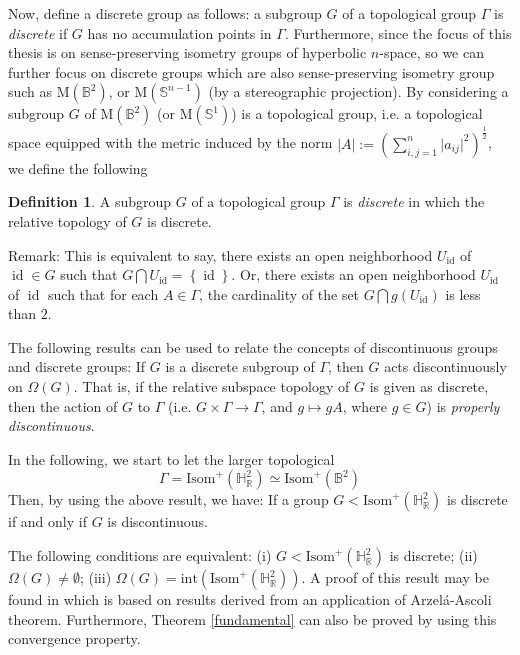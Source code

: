 \documentclass[12pt,oneside]{sfsuthesis}
\theoremstyle{plain} %
\theoremstyle{definition}  %
\newtheorem{definition}{Definition}[chapter]
\theoremstyle{remark}  %
\theoremstyle{plain}
\DeclareMathOperator{\id}{id}
\begin{document}
{Now, define a discrete group as follows: a subgroup $G$ of a topological group $\Gamma$ is \textit{discrete} if $G$ has no accumulation points in $\Gamma$. Furthermore, since the focus of this thesis is on sense-preserving isometry groups of hyperbolic $n$-space, so we can further focus on discrete groups which are also sense-preserving isometry group such as $\text{M}(\mathbb{B}^2)$, or $\text{M}(\mathbb{S}^{n-1})$ (by a stereographic projection).
By considering a subgroup $G$ of $\text{M}(\mathbb{B}^2)$ (or $\text{M}(\mathbb{S}^{1})$) is a topological group, i.e. a topological space equipped with the metric induced by the norm $\left\vert A \right\vert := \left( \sum\limits_{i,j=1}^n \vert a_{ij}\vert^2 \right)^{\frac{1}{2}}$, we define the following
\begin{definition}%
A subgroup $G$ of a topological group $\Gamma$ is \textit{discrete} in which the relative topology of $G$ is discrete.
\end{definition}
Remark: This is equivalent to say, there exists an open neighborhood $U_{\id}$ of $\id\in G$ such that $G\bigcap U_{\id}=\left\lbrace \id \right\rbrace$. Or, there exists an open neighborhood $U_{\id}$ of $\id$ such that for each $A\in \Gamma$, the  cardinality of the set $G\bigcap g(U_{\id})$ is less than $2$.

The following results can be used to relate the concepts of discontinuous groups and discrete groups: If $G$ is a discrete subgroup of $\Gamma$, then $G$ acts discontinuously on $\Omega(G)$. That is, if the relative subspace topology of $G$ is given as discrete, then the action of $G$ to $\Gamma$ (i.e. $G\times \Gamma\rightarrow \Gamma$, and $g\mapsto gA$, where $g\in G$) is \textit{properly discontinuous}.

In the following, we start to let the larger topological $$\Gamma=\text{Isom}^+(\mathbb{H}^2_\mathbb{R})\simeq\text{Isom}^+(\mathbb{B}^2)$$ 
Then, by using the above result, we have: If a group $G<\text{Isom}^+(\mathbb{H}^2_\mathbb{R})$ is discrete if and only if $G$ is discontinuous.%



The following conditions are equivalent: (i) $G<\text{Isom}^+(\mathbb{H}^2_\mathbb{R})$ is discrete; (ii) $\Omega(G)\neq \emptyset$; (iii) $\Omega(G)=\text{int}(\text{Isom}^+(\mathbb{H}^2_\mathbb{R}))$. A proof of this result may be found in \cite[Theorem 1.2.16]{cano2013complex} which is based on results derived from an application of Arzel\'{a}-Ascoli theorem. Furthermore, Theorem \ref{fundamental} can also be proved by using this convergence property.

}
\end{document}
